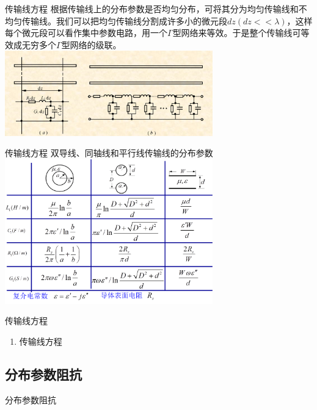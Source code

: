 \begin{frame}{传输线方程}
  根据传输线上的分布参数是否均匀分布，可将其分为均匀传输线和不均匀传输线。我们可以把均匀传输线分割成许多小的微元段$dz(dz<<\lambda)$，这样每个微元段可以看作集中参数电路，用一个$\Gamma$型网络来等效。于是整个传输线可等效成无穷多个$\Gamma$型网络的级联。\\
  \centering
  \includegraphics[width=9cm]{transmissionline1.png}
\end{frame}

\begin{frame}{传输线方程}
  双导线、同轴线和平行线传输线的分布参数\\
  \centering
  \includegraphics[width=9cm]{tmlineparas.png}
\end{frame}

\begin{frame}{传输线方程}
  \begin{enumerate}
    \resume
    \item 传输线方程\\
    
  \end{enumerate}
\end{frame}

\subsection{分布参数阻抗}
\begin{frame}{分布参数阻抗}

\end{frame}

